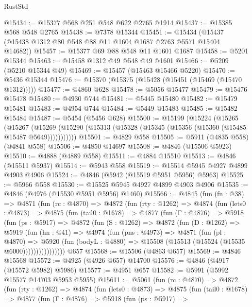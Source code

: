 \begin{lexlean}{RustStd}
\begin{coremodule}
@15434 := @15377 @568 @251 @548 @622 @2765 @1914
@15437 := @15385 @568 @548 @2765
@15438 := @7378 @15344
@15451 := @15434 (@15437 (@15438 @1312 @80 @548 @88 @11 @1604 @1687 @2763 @5571 @15404 @14682))
@15457 := @15377 @69 @88 @548 @11 @1601 @1687
@15458 := @5201 @15344
@15463 := @15458 @1312 @49 @548 @49 @1601
@15466 := @5209 (@5210 @15344 @49)
@15469 := @15457 (@15463 @15466 @5220)
@15470 := @5436 @15344
@15476 := @15370 (@15375 (@15428 (@15451 (@15469 (@15470 @1312)))))
@15477 := @4860 @628
@15478 := @5056 @15477
@15479 := @15476 @15478
@15480 := @4930 @744
@15481 := @5445 @15480
@15482 := @15479 @15481
@15483 := @4954 @744
@15484 := @5449 @15483
@15485 := @15482 @15484
@15487 := @5454 (@5456 @628)
@15500 := @15199
    (@15224
      (@15265
        (@15267
          (@15269 (@15290 (@15313 (@15328 (@15345 (@15356 (@15360 (@15485 @15487 @5649)))))))))))
@15501 := @4829 @558
@15505 := @5911 (@4835 @558) (@4841 @558)
@15506 := @4850 @14697
@15508 := @4846 (@15506 @5923)
@15510 := @4888 (@4889 @558)
@15511 := @4884 @15510
@15513 := @4846 (@15511 @5937)
@15514 := @5943 @558
@15519 := @15514 @5945 @4927 @4899 @4903 @4906
@15524 := @4846 (@5942 (@15519 @5951 @5956) @5963)
@15525 := @5966 @558
@15530 := @15525 @5945 @4927 @4899 @4903 @4906
@15535 := @4846 (@4976 (@15530 @5951 @5956) @1460)
@15566 := @4845
    (fun (fn : @38) =>
    @4871
      (fun (rc : @4870) =>
      @4872
        (fun (rty : @1262) =>
        @4874
          (fun (lets0 : @4873) =>
          @4875
            (fun (tail0 : @1678) =>
            @4877
              (fun (Γ : @4876) =>
              @5918
                (fun (ps : @5917) =>
                @4872
                  (fun (S : @1262) =>
                  @4872
                    (fun (D : @1262) =>
                    @5919
                      (fun (hn : @41) =>
                      @4974
                        (fun (pns : @4973) =>
                        @4871
                          (fun (pl : @4870) =>
                          @5920
                            (fun (bodyL : @4880) =>
                            @15508 (@15513 (@15524 (@15535 @6000))))))))))))))))
    @657
@15568 := @15506 (@4863 @657)
@15569 := @4846 @15568
@15572 := @4925 (@4926 @657) @14700
@15576 := @4846 (@4917 (@15572 @5982) @5986)
@15577 := @4951 @657
@15582 := @5991 (@5992 @15577 @14703 @5953 @5955)
@15611 := @5061
    (fun (rc : @4870) =>
    @4872
      (fun (rty : @1262) =>
      @4874
        (fun (lets0 : @4873) =>
        @4875
          (fun (tail0 : @1678) =>
          @4877
            (fun (Γ : @4876) =>
            @5918
              (fun (ps : @5917) =>

\end{coremodule}
\end{lexlean}
